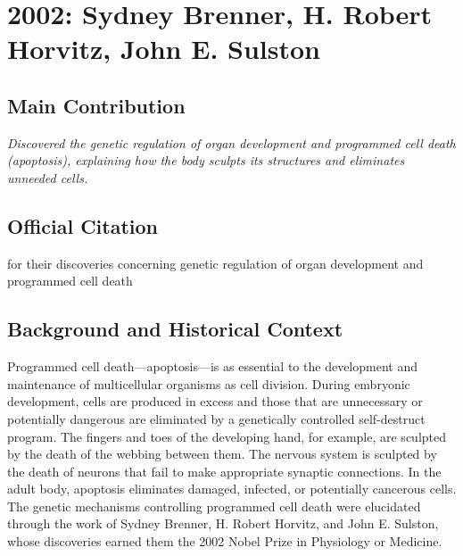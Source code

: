 \chapter[2002 --- Brenner et al.]{2002: Sydney Brenner, H. Robert Horvitz, John E. Sulston}
\label{ch:2002_Brenner}

\section*{Main Contribution}

\textit{Discovered the genetic regulation of organ development and programmed cell death (apoptosis), explaining how the body sculpts its structures and eliminates unneeded cells.}\cite{nobel-2002,lecture-2002}

\section{Official Citation}

for their discoveries concerning genetic regulation of organ development and programmed cell death

\section{Background and Historical Context}

Programmed cell death---apoptosis---is as essential to the development and maintenance of multicellular organisms as cell division. During embryonic development, cells are produced in excess and those that are unnecessary or potentially dangerous are eliminated by a genetically controlled self-destruct program. The fingers and toes of the developing hand, for example, are sculpted by the death of the webbing between them. The nervous system is sculpted by the death of neurons that fail to make appropriate synaptic connections. In the adult body, apoptosis eliminates damaged, infected, or potentially cancerous cells. The genetic mechanisms controlling programmed cell death were elucidated through the work of Sydney Brenner, H. Robert Horvitz, and John E. Sulston, whose discoveries earned them the 2002 Nobel Prize in Physiology or Medicine.

